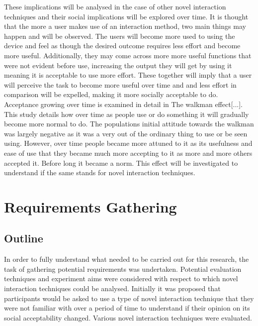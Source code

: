 \documentclass{l4proj}
\begin{document}
These implications will be analysed in the case of other novel interaction techniques and their social implications will be explored over time. It is thought that the more a user makes use of an interaction method, two main things may happen and will be observed. The users will become more used to using the device and feel as though the desired outcome requires less effort and become more useful. Additionally, they may come across more more useful functions that were not evident before use, increasing the output they will get by using it meaning it is acceptable to use more effort. These together will imply that a user will perceive the task to become more useful over time and and less effort in comparison will be expelled, making it more socially acceptable to do. Acceptance growing over time is examined in detail in The walkman effect[...]. This study details how over time as people use or do something it will gradually become more normal to do. The populations initial attitude towards the walkman was largely negative as it was a very out of the ordinary thing to use or be seen using. However, over time people became more attuned to it as its usefulness and ease of use that they became much more accepting to it as more and more others accepted it. Before long it became a norm. This effect will be investigated to understand if the same stands for novel interaction techniques.



\chapter{Requirements Gathering}

\section{Outline}

In order to fully understand what needed to be carried out for this research, the task of gathering potential requirements was undertaken. Potential evaluation techniques and experiment aims were considered with respect to which novel interaction techniques could be analysed. Initially it was proposed that participants would be asked to use a type of novel interaction technique that they were not familiar with over a period of time to understand if their opinion on its social acceptability changed. Various novel interaction techniques were evaluated.
\end{document}
